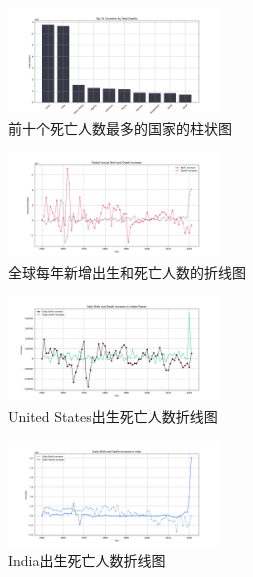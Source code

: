 \documentclass{ctexart}
\begin{document}
    \begin{figure}[h!]
        \centering
        \includegraphics[width=0.5\textwidth]{img/前十个死亡人数最多的国家的柱状图.png}
        \caption{前十个死亡人数最多的国家的柱状图}
        \label{5}
    \end{figure}

    \begin{figure}[h!]
        \centering
        \includegraphics[width=0.5\textwidth]{img/全球每年新增出生和死亡人数的折线图.png}
        \caption{全球每年新增出生和死亡人数的折线图}
        \label{6}
    \end{figure}

    \begin{figure}[h!]
        \centering
        \includegraphics[width=0.5\textwidth]{img/United States出生死亡人数折线图.png}
        \caption{United States出生死亡人数折线图}
        \label{7}
    \end{figure}

    \begin{figure}[h!]
        \centering
        \includegraphics[width=0.5\textwidth]{img/India出生死亡人数折线图.png}
        \caption{India出生死亡人数折线图}
        \label{8}
    \end{figure}
\end{document}
